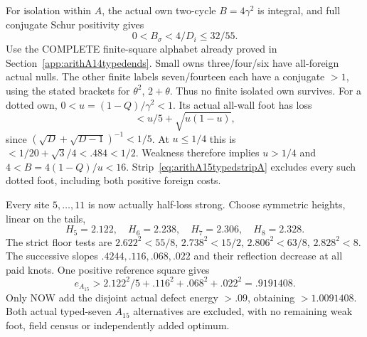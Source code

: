 For isolation within \(A\), the actual
own two-cycle \(B=4\gamma^2\) is integral,
and full conjugate Schur positivity gives
\[
                         0<B_\sigma<4/D_i\le32/55 .
\]
Use the COMPLETE finite-square alphabet
already proved in
Section~\ref{app:arithA14typedends}.
Small owns three/four/six have all-foreign
actual nulls.
The other finite labels seven/fourteen
each have a conjugate \(>1\), using
the stated brackets for \(\theta^2\),
\(2+\theta\).
Thus no finite isolated own survives.
For a dotted own, \(0<u=(1-Q)/\gamma^2<1\).
Its actual all-wall foot has loss
\[
                  <u/5+\sqrt{u(1-u)},
\]
since \((\sqrt D+\sqrt{D-1})^{-1}<1/5\).
At \(u\le1/4\) this is
\(<1/20+\sqrt3/4<.484<1/2\).
Weakness therefore implies \(u>1/4\)
and \(4<B=4(1-Q)/u<16\).
Strip~\eqref{eq:arithA15typedstripA}
excludes every such dotted foot, including
both positive foreign costs.

Every site \(5,\ldots,11\) is now actually
half-loss strong.
Choose symmetric heights, linear on the tails,
\[
           H_5=2.122,\quad H_6=2.238,\quad
           H_7=2.306,\quad H_8=2.328 .
\]
The strict floor tests are
\(2.622^2<55/8\), \(2.738^2<15/2\),
\(2.806^2<63/8\), \(2.828^2<8\).
The successive slopes
\(.4244,.116,.068,.022\) and their
reflection decrease at all paid knots.
One positive reference square gives
\[
        e_{A_{15}}>2.122^2/5+.116^2+.068^2+.022^2=.9191408 .
\]
Only NOW add the disjoint actual defect
energy \(>.09\), obtaining \(>1.0091408\).
Both actual typed-seven \(A_{15}\) alternatives
are excluded, with no remaining weak foot,
field census or independently added optimum.

































